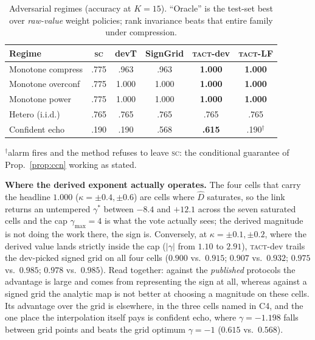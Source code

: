 \documentclass[twoside,11pt]{article}
\newcommand{\Dhat}{\widehat{D}}
\newcommand{\SC}{\textsc{sc}}
\newcommand{\TACT}{\textsc{tact}}
\begin{document}
\begin{table}[t]
\centering
\caption{Adversarial regimes (accuracy at $K{=}15$). ``Oracle'' is the test-set best over \emph{raw-value} weight policies; rank invariance beats that entire family under compression.}
\label{tab:adv}
\setlength{\tabcolsep}{3.2pt}
\begin{tabular}{l cc cc c}
\toprule
Regime & \SC & devT & SignGrid & \textbf{\TACT-dev} & \textbf{\TACT-LF}\\
\midrule
Monotone compress & .775 & .963 & .963 & \textbf{1.000} & \textbf{1.000}\\
Monotone overconf & .775 & 1.000 & 1.000 & \textbf{1.000} & \textbf{1.000}\\
Monotone power & .775 & 1.000 & 1.000 & \textbf{1.000} & \textbf{1.000}\\
Hetero (i.i.d.) & .765 & .765 & .765 & .765 & .765\\
Confident echo & .190 & .190 & .568 & \textbf{.615} & .190$^{\dagger}$\\
\bottomrule
\end{tabular}
\vspace{2pt}
{\footnotesize $^{\dagger}$alarm fires and the method refuses to leave \SC:
the conditional guarantee of Prop.~\ref{prop:ccn} working as stated.}
\end{table}


\textbf{Where the derived exponent actually operates.} The four cells that
carry the headline $1.000$ ($\kappa=\pm0.4,\pm0.6$) are cells where $\Dhat$
saturates, so the link returns an untempered $\gamma^\ast$ between $-8.4$ and
$+12.1$ across the seven saturated cells and the cap $\gamma_{\max}=4$ is what
the vote actually sees; the derived magnitude is not doing the
work there, the sign is. Conversely, at $\kappa=\pm0.1,\pm0.2$, where the
derived value lands strictly inside the cap ($|\gamma|$ from $1.10$ to $2.91$),
\TACT-dev trails the dev-picked signed grid on all four cells ($0.900$ vs.\
$0.915$; $0.907$ vs.\ $0.932$; $0.975$ vs.\ $0.985$; $0.978$ vs.\ $0.985$).
Read together: against the \emph{published} protocols the advantage is large
and comes from representing the sign at all, whereas against a signed grid the
analytic map is not better at choosing a magnitude on these cells. Its
advantage over the grid is elsewhere, in the three cells named in C4, and the
one place the interpolation itself pays is confident echo, where $\gamma=-1.198$
falls between grid points and beats the grid optimum $\gamma=-1$
($0.615$ vs.\ $0.568$).
\end{document}

